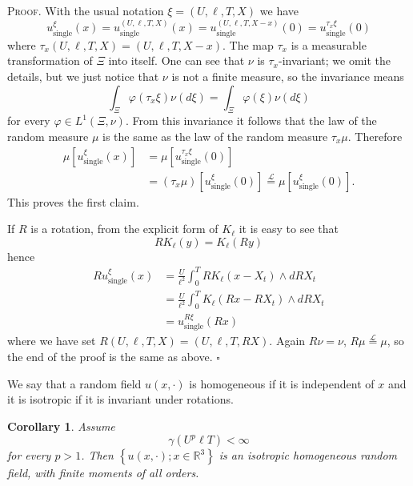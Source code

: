 \documentclass[a4paper,12pt]{article}
\newtheorem{corollary}{Corollary}
\begin{document}
\textsc{Proof. }With the usual notation $\xi=(U,\ell,T,X)$ we have
\[
u_{\text{single}}^{\xi}\left(  x\right)  =u_{\text{single}}^{(U,\ell
,T,X)}\left(  x\right)  =u_{\text{single}}^{(U,\ell,T,X-x)}\left(  0\right)
=u_{\text{single}}^{\tau_{x}\xi}\left(  0\right)
\]
where $\tau_{x}(U,\ell,T,X)=(U,\ell,T,X-x)$. The map $\tau_{x}$ is a
measurable transformation of $\Xi$ into itself. One can see that $\nu$ is
$\tau_{x}$-invariant; we omit the details, but we just notice that $\nu$ is
not a finite measure, so the invariance means
\[
\int_{\Xi}\varphi\left(  \tau_{x}\xi\right)  \nu\left(  d\xi\right)
=\int_{\Xi}\varphi\left(  \xi\right)  \nu\left(  d\xi\right)
\]
for every $\varphi\in L^{1}\left(  \Xi,\nu\right)  $. From this invariance it
follows that the law of the random measure $\mu$ is the same as the law of the
random measure $\tau_{x}\mu$. Therefore
\begin{align*}
\mu\left[  u_{\text{single}}^{\xi}\left(  x\right)  \right]   &  =\mu\left[
u_{\text{single}}^{\tau_{x}\xi}\left(  0\right)  \right] \\
&  =\left(  \tau_{x}\mu\right)  \left[  u_{\text{single}}^{\xi}\left(
0\right)  \right]  \overset{\mathcal{L}}{=}\mu\left[  u_{\text{single}}^{\xi
}\left(  0\right)  \right]  .
\end{align*}
This proves the first claim.

If $R$ is a rotation, from the explicit form of $K_{\ell}$ it is easy to see
that
\[
RK_{\ell}(y)=K_{\ell}(Ry)
\]
hence
\begin{align*}
Ru_{\text{single}}^{\xi}\left(  x\right)   &  =\frac{U}{\ell^{2}}\int_{0}%
^{T}RK_{\ell}(x-X_{t})\wedge dRX_{t}\\
&  =\frac{U}{\ell^{2}}\int_{0}^{T}K_{\ell}(Rx-RX_{t})\wedge dRX_{t}\\
&  =u_{\text{single}}^{R\xi}\left(  Rx\right)
\end{align*}
where we have set $R(U,\ell,T,X)=(U,\ell,T,RX)$. Again $R\nu=\nu$,
$R\mu\overset{\mathcal{L}}{=}\mu$, so the end of the proof is the same as
above. \hfill$\square$

We say that a random field $u(x,\cdot)$ is homogeneous if it is independent of
$x$ and it is isotropic if it is invariant under rotations.

\begin{corollary}
\label{corollarybase}Assume
\[
\gamma(U^{p}\ell T)<\infty
\]
for every $p>1$. Then $\left\{  u(x,\cdot);x\in\mathbb{R}^{3}\right\}  $ is an
isotropic homogeneous random field, with finite moments of all orders.
\end{corollary}
\end{document}

